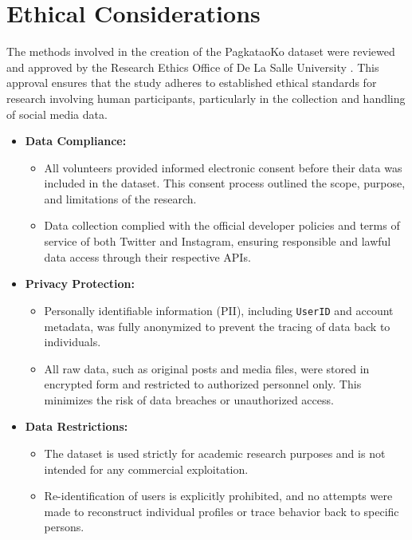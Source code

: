 \section{Ethical Considerations}
\label{sec:Ethics}

The methods involved in the creation of the PagkataoKo dataset were reviewed and approved by the Research Ethics Office of De La Salle University \citep{Tighe_Acorda_Agno_Gano_Go_Santiago_Sedillo_2022}. This approval ensures that the study adheres to established ethical standards for research involving human participants, particularly in the collection and handling of social media data.

\begin{itemize}
	\item \textbf{Data Compliance:}
	\begin{itemize}
		\item All volunteers provided informed electronic consent before their data was included in the dataset. This consent process outlined the scope, purpose, and limitations of the research.
		\item Data collection complied with the official developer policies and terms of service of both Twitter and Instagram, ensuring responsible and lawful data access through their respective APIs.
	\end{itemize}
	
	\item \textbf{Privacy Protection:}
	\begin{itemize}
		\item Personally identifiable information (PII), including \texttt{UserID} and account metadata, was fully anonymized to prevent the tracing of data back to individuals.
		\item All raw data, such as original posts and media files, were stored in encrypted form and restricted to authorized personnel only. This minimizes the risk of data breaches or unauthorized access.
	\end{itemize}
	
	\item \textbf{Data Restrictions:}
	\begin{itemize}
		\item The dataset is used strictly for academic research purposes and is not intended for any commercial exploitation.
		\item Re-identification of users is explicitly prohibited, and no attempts were made to reconstruct individual profiles or trace behavior back to specific persons.
	\end{itemize}
\end{itemize}

